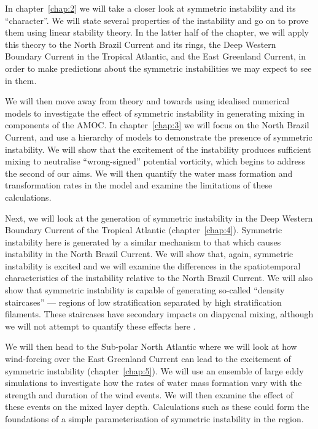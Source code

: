 In chapter~\ref{chap:2} we will take a closer look at symmetric instability and its ``character''. We will state several properties of the instability and go on to prove them using linear stability theory. In the latter half of the chapter, we will apply this theory to the North Brazil Current and its rings, the Deep Western Boundary Current in the Tropical Atlantic, and the East Greenland Current, in order to make predictions about the symmetric instabilities we may expect to see in them.

We will then move away from theory and towards using idealised numerical models to investigate the effect of symmetric instability in generating mixing in components of the AMOC. In chapter~\ref{chap:3} we will focus on the North Brazil Current, and use a hierarchy of models to demonstrate the presence of symmetric instability. We will show that the excitement of the instability produces sufficient mixing to neutralise ``wrong-signed'' potential vorticity, which begins to address the second of our aims. We will then quantify the water mass formation and transformation rates in the model and examine the limitations of these calculations.

Next, we will look at the generation of symmetric instability in the Deep Western Boundary Current of the Tropical Atlantic (chapter~\ref{chap:4}). Symmetric instability here is generated by a similar mechanism to that which causes instability in the North Brazil Current. We will show that, again, symmetric instability is excited and we will examine the differences in the spatiotemporal characteristics of the instability relative to the North Brazil Current. We will also show that symmetric instability is capable of generating so-called ``density staircases'' --- regions of low stratification separated by high stratification filaments. These staircases have secondary impacts on diapycnal mixing, although we will not attempt to quantify these effects here \citep{Schmitt2005}.

We will then head to the Sub-polar North Atlantic where we will look at how wind-forcing over the East Greenland Current can lead to the excitement of symmetric instability (chapter~\ref{chap:5}). We will use an ensemble of large eddy simulations to investigate how the rates of water mass formation vary with the strength and duration of the wind events. We will then examine the effect of these events on the mixed layer depth. Calculations such as these could form the foundations of a simple parameterisation of symmetric instability in the region.
